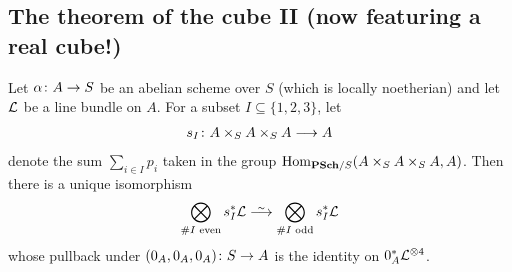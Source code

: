 \documentclass[a4paper,parskip=half,numbers=enddot, DIV=12]{scrreprt}
\begin{document}
\subsection{The theorem of the cube II (now featuring a real cube!)}
\begin{thm}
	Let $\alpha\colon A\morphism S$ be an abelian scheme over $S$ (which is locally noetherian) and let $\mathcal{L}$ be a line bundle on $A$. For a subset $I\subseteq\{1,2,3\}$, let
	\begin{align*}
		s_I\colon A\times_SA\times_SA\morphism A
	\end{align*}
	denote the sum $\sum_{i\in I}p_i$ taken in the group $\Hom_{\cat{PSch}/S}(A\times_SA\times_SA,A)$. Then there is a unique isomorphism
	\begin{align}\lbl{eq:desiredIso}
		\bigotimes_{\#I\text{ even}}s_I^*\Ll\isomorphism \bigotimes_{\#I\text{ odd}}s_I^*\Ll
	\end{align}
	whose pullback under $( 0_A, 0_A, 0_A)\colon S\morphism A$ is the identity on $ 0_A^*\mathcal{L}^{\otimes 4}$.
\end{thm}
\end{document}
